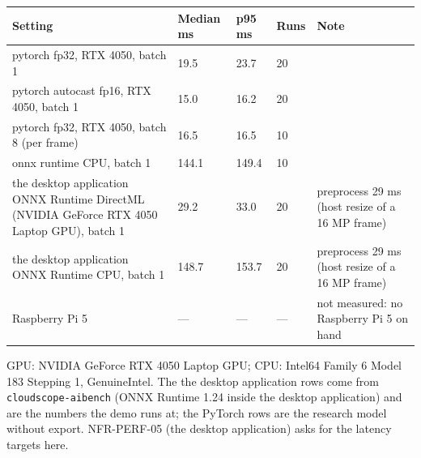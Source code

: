 \begin{center}{\scriptsize\setlength{\tabcolsep}{3pt}
\begin{tabular}{p{8.7cm}lllp{5.2cm}}
\toprule
Setting & Median ms & p95 ms & Runs & Note \\
\midrule
pytorch fp32, RTX 4050, batch 1 & 19.5 & 23.7 & 20 &  \\
pytorch autocast fp16, RTX 4050, batch 1 & 15.0 & 16.2 & 20 &  \\
pytorch fp32, RTX 4050, batch 8 (per frame) & 16.5 & 16.5 & 10 &  \\
onnx runtime CPU, batch 1 & 144.1 & 149.4 & 10 &  \\
the desktop application ONNX Runtime DirectML (NVIDIA GeForce RTX 4050 Laptop GPU), batch 1 & 29.2 & 33.0 & 20 & preprocess 29 ms (host resize of a 16 MP frame) \\
the desktop application ONNX Runtime CPU, batch 1 & 148.7 & 153.7 & 20 & preprocess 29 ms (host resize of a 16 MP frame) \\
Raspberry Pi 5 & --- & --- & --- & not measured: no Raspberry Pi 5 on hand \\
\bottomrule
\end{tabular}}
\end{center}

GPU: NVIDIA GeForce RTX 4050 Laptop GPU; CPU: Intel64 Family 6 Model 183 Stepping 1, GenuineIntel. The the desktop application rows come from \texttt{cloudscope-aibench} (ONNX Runtime 1.24 inside the desktop application) and are the numbers the demo runs at; the PyTorch rows are the research model without export. NFR-PERF-05 (the desktop application) asks for the latency targets here.

